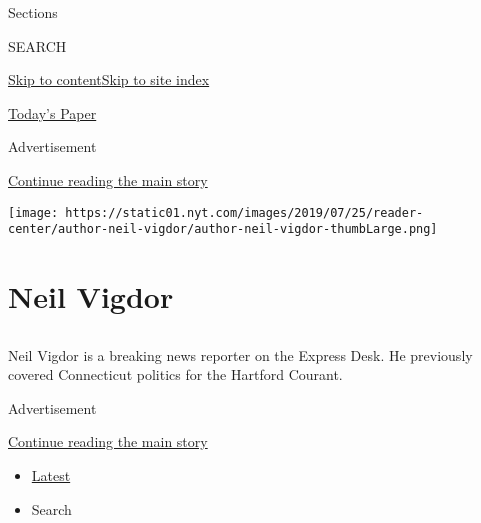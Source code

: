 Sections

SEARCH

\protect\hyperlink{site-content}{Skip to
content}\protect\hyperlink{site-index}{Skip to site index}

\href{https://myaccount.nytimes.com/auth/login?response_type=cookie\&client_id=vi}{}

\href{https://www.nytimes.com/section/todayspaper}{Today's Paper}

Advertisement

\protect\hyperlink{after-top}{Continue reading the main story}

\texttt{[image: https://static01.nyt.com/images/2019/07/25/reader-center/author-neil-vigdor/author-neil-vigdor-thumbLarge.png]}

\hypertarget{neil-vigdor}{%
\section{Neil Vigdor}\label{neil-vigdor}}

\subsection{}

Neil Vigdor is a breaking news reporter on the Express Desk. He
previously covered Connecticut politics for the Hartford Courant.

Advertisement

\protect\hyperlink{after-mid1}{Continue reading the main story}

\begin{itemize}
\tightlist
\item
  \protect\hyperlink{stream-panel}{Latest}
\item
  Search
\end{itemize}

